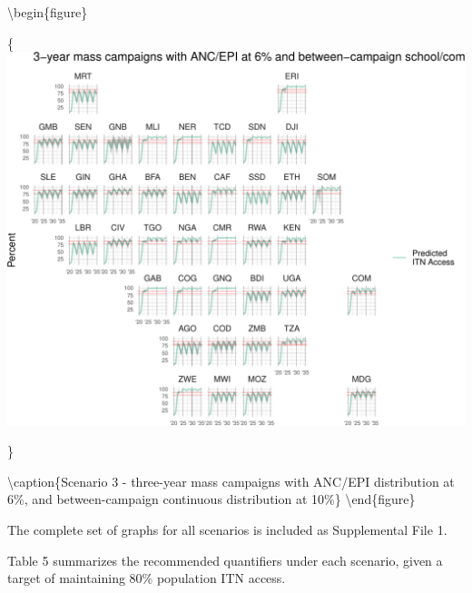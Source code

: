 \documentclass[review,
3p]{elsarticle} %
\begin{document}
\textbackslash begin\{figure\}

\{\centering \includegraphics[width=0.8\linewidth]{quant_paper_files/figure-latex/geo_facets_cducc-1}

\}

\textbackslash caption\{\label{geo_facets_cducc}Scenario 3 - three-year
mass campaigns with ANC/EPI distribution at 6\%, and between-campaign
continuous distribution at 10\%\}\label{fig:geo_facets_cducc}
\textbackslash end\{figure\}

The complete set of graphs for all scenarios is included as Supplemental
File 1.

Table 5 summarizes the recommended quantifiers under each scenario,
given a target of maintaining 80\% population ITN access.
\end{document}
